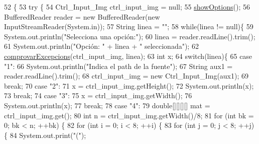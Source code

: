 \begin{DoxyCode}
52                                            \{
53     \textcolor{keywordflow}{try} \{
54         Ctrl\_Input\_Img ctrl\_input\_img = null;
55         \hyperlink{classpersistencia_1_1input_1_1Driver____Ctrl__Input__Img_a63892d1060c96a4478541bf0feff579d}{showOptions}();
56         BufferedReader reader = \textcolor{keyword}{new} BufferedReader(\textcolor{keyword}{new} InputStreamReader(System.in));
57         String linea = \textcolor{stringliteral}{""};
58         \textcolor{keywordflow}{while}(linea != null)\{
59             System.out.println(\textcolor{stringliteral}{"Selecciona una opción:"});
60             linea = reader.readLine().trim();
61             System.out.println(\textcolor{stringliteral}{"Opción: "} + linea + \textcolor{stringliteral}{" seleccionada"});
62             \hyperlink{classpersistencia_1_1input_1_1Driver____Ctrl__Input__Img_a60b4011cee02b5c7fc213230db46d6e0}{comprovarExcepcions}(ctrl\_input\_img, linea);
63             \textcolor{keywordtype}{int} x;
64             \textcolor{keywordflow}{switch}(linea)\{
65                 \textcolor{keywordflow}{case} \textcolor{stringliteral}{"1"}:
66                     System.out.println(\textcolor{stringliteral}{"Indica el path de la fuente"});
67                     String aux1 = reader.readLine().trim();
68                     ctrl\_input\_img = \textcolor{keyword}{new} Ctrl\_Input\_Img(aux1);
69                 \textcolor{keywordflow}{break};
70                 \textcolor{keywordflow}{case} \textcolor{stringliteral}{"2"}:
71                     x = ctrl\_input\_img.getHeight();
72                     System.out.println(x);
73                 \textcolor{keywordflow}{break};
74                 \textcolor{keywordflow}{case} \textcolor{stringliteral}{"3"}:
75                     x = ctrl\_input\_img.getWidth();
76                     System.out.println(x);
77                 \textcolor{keywordflow}{break};
78                 \textcolor{keywordflow}{case} \textcolor{stringliteral}{"4"}:
79                     \textcolor{keywordtype}{double}[][][][] mat = ctrl\_input\_img.get();
80                     \textcolor{keywordtype}{int} n = ctrl\_input\_img.getWidth()/8;
81                     \textcolor{keywordflow}{for} (\textcolor{keywordtype}{int} bk = 0; bk < n; ++bk) \{
82                         \textcolor{keywordflow}{for} (\textcolor{keywordtype}{int} i = 0; i < 8; ++i) \{
83                             \textcolor{keywordflow}{for} (\textcolor{keywordtype}{int} j = 0; j < 8; ++j) \{
84                                 System.out.print(\textcolor{stringliteral}{"("});

\end{DoxyCode}
